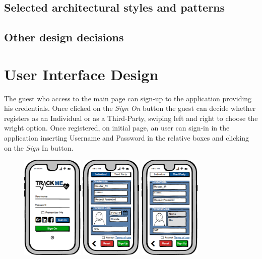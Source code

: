 \documentclass[a4paper]{article}
\begin{document}
\newpage

\subsection{Selected architectural styles and patterns}

\newpage

\subsection{Other design decisions}

\newpage

\section{User Interface Design}

The guest who access to the main page can sign-up to the application providing his credentials. Once clicked on the \textit{Sign On} button the guest can decide whether registers as an Individual or as a Third-Party, swiping left and right to choose the wright option. Once registered, on initial page, an user can sign-in in the application inserting Username and Password in the relative boxes and clicking on the \textit{Sign} In button. 

\begin{figure}[!htpb]
    	\centering
    	\includegraphics[height=50mm]{images/mockups/Login_Registration.png}
    	\includegraphics[height=50mm]{images/mockups/RegistrationForm.png}
    	\includegraphics[height=50mm]{images/mockups/ThirdPartyRegistration.png}
    	
    	
        \end{figure}
\end{document}

